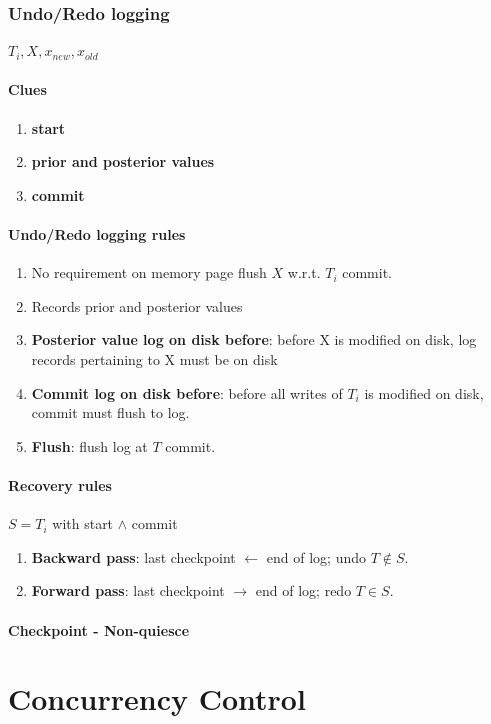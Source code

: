 \documentclass[a4paper]{report}
\begin{document}
\subsection{Undo/Redo logging}
$T_i, X, x_{new}, x_{old}$
\subsubsection{Clues}
\begin{enumerate}
\item \textbf{start}
\item \textbf{prior and posterior values}
\item \textbf{commit}
\end{enumerate}

\subsubsection{Undo/Redo logging rules}
\begin{enumerate}
\item No requirement on memory page flush $X$ w.r.t. $T_i$ commit.
\item Records prior and posterior values
\item \textbf{Posterior value log on disk before}: before X is modified on disk, log
records pertaining to X must be on disk
\item \textbf{Commit log on disk before}: before all writes of $T_i$ 
is modified on disk, commit must flush to log.
\item \textbf{Flush}: flush log at $T$ commit. 
\end{enumerate}

\subsubsection{Recovery rules}
$S = T_i$ with start $\wedge$ commit
\begin{enumerate}
\item \textbf{Backward pass}: last checkpoint $\leftarrow$ end of log; undo $T \notin S$.
\item \textbf{Forward pass}: last checkpoint $\rightarrow$ end of log; redo $T \in S$.
\end{enumerate}

\subsubsection{Checkpoint - Non-quiesce}


\chapter{Concurrency Control}
\end{document}
